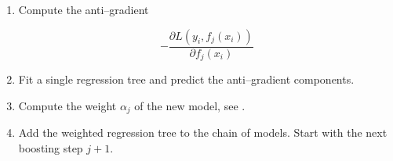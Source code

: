 \begin{enumerate}
\item Compute the anti--gradient

\begin{equation}
- \frac{\partial L(y_i, f_j(x_i))}{\partial f_j(x_i)}
\end{equation}

\item Fit a single regression tree and predict the anti--gradient components.

\item Compute the weight $\alpha_j$ of the new model, see \eg \citet{friedman2002}.

\item Add the weighted regression tree to the chain of models. Start with the next boosting step $j + 1$.
\end{enumerate}

%
